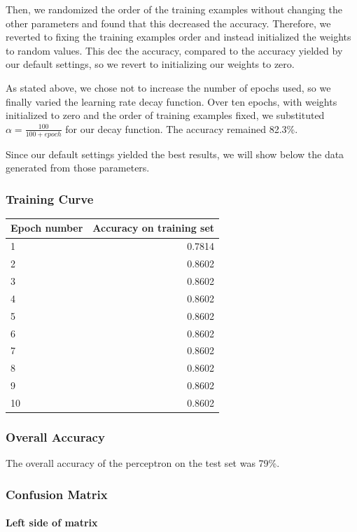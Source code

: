 Then, we randomized the order of the training examples without changing the other parameters and found that this decreased the accuracy. Therefore, we reverted to fixing the training examples order and instead initialized the weights to random values. This dec the accuracy, compared to the accuracy yielded by our default settings, so we revert to initializing our weights to zero.

As stated above, we chose not to increase the number of epochs used, so we finally varied the learning rate decay function. Over ten epochs, with weights initialized to zero and the order of training examples fixed, we substituted $\alpha = \frac{100}{100+epoch}$ for our decay function. The accuracy remained 82.3\%.

Since our default settings yielded the best results, we will show below the data generated from those parameters.

\subsubsection{Training Curve}
\begin{tabular}{l|r}
Epoch number & Accuracy on training set \\
\hline
1 & 0.7814 \\
2 & 0.8602 \\
3 & 0.8602 \\
4 & 0.8602 \\
5 & 0.8602 \\
6 & 0.8602 \\
7 & 0.8602 \\
8 & 0.8602 \\
9 & 0.8602 \\
10 & 0.8602 \\
\end{tabular}

\subsubsection{Overall Accuracy}
The overall accuracy of the perceptron on the test set was 79\%.

\subsubsection{Confusion Matrix}
\paragraph{Left side of matrix}

